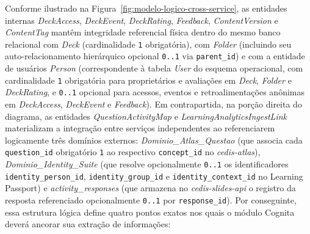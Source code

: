 Conforme ilustrado na Figura~\ref{fig:modelo-logico-cross-service}, as entidades internas \textit{DeckAccess}, \textit{DeckEvent}, \textit{DeckRating}, \textit{Feedback}, \textit{ContentVersion} e \textit{ContentTag} mantêm integridade referencial física dentro do mesmo banco relacional com \textit{Deck} (cardinalidade \texttt{1} obrigatória), com \textit{Folder} (incluindo seu auto-relacionamento hierárquico opcional \texttt{0..1} via \texttt{parent\_id}) e com a entidade de usuários \textit{Person} (correspondente à tabela \textit{User} do esquema operacional, com cardinalidade \texttt{1} obrigatória para proprietários e avaliações em \textit{Deck}, \textit{Folder} e \textit{DeckRating}, e \texttt{0..1} opcional para acessos, eventos e retroalimentações anônimas em \textit{DeckAccess}, \textit{DeckEvent} e \textit{Feedback}). Em contrapartida, na porção direita do diagrama, as entidades \textit{QuestionActivityMap} e \textit{LearningAnalyticsIngestLink} materializam a integração entre serviços independentes ao referenciarem logicamente três domínios externos: \textit{Dominio\_Atlas\_Questao} (que associa cada \texttt{question\_id} obrigatório \texttt{1} ao respectivo \texttt{concept\_id} no \textit{cedis-atlas}), \textit{Dominio\_Identity\_Suite} (que resolve opcionalmente \texttt{0..1} os identificadores \texttt{identity\_person\_id}, \texttt{identity\_group\_id} e \texttt{identity\_context\_id} no Learning Passport) e \textit{activity\_responses} (que armazena no \textit{cedis-slides-api} o registro da resposta referenciado opcionalmente \texttt{0..1} por \texttt{response\_id}). Por conseguinte, essa estrutura lógica define quatro pontos exatos nos quais o módulo Cognita deverá ancorar sua extração de informações:
